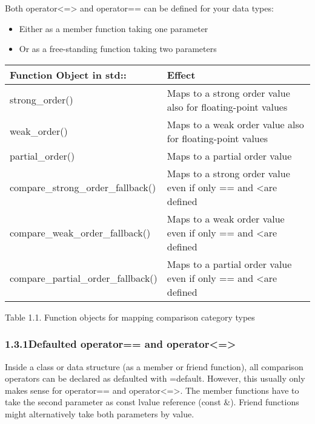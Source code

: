 

Both operator<=> and operator== can be defined for your data types:

\begin{itemize}
\item
Either as a member function taking one parameter

\item
Or as a free-standing function taking two parameters
\end{itemize}


\begin{table}[H]
\begin{tabular}{|l|l|}
	\hline
	\textbf{Function Object in std::} & \textbf{Effect}                                             \\ \hline
	strong\_order()                   & Maps to a strong order value also for floating-point values \\ \hline
	weak\_order()                     & Maps to a weak order value also for floating-point values   \\ \hline
	partial\_order()                  & Maps to a partial order value                               \\ \hline
	compare\_strong\_order\_fallback()  & Maps to a strong order value even if only == and \textless are defined  \\ \hline
	compare\_weak\_order\_fallback()    & Maps to a weak order value even if only == and \textless are defined    \\ \hline
	compare\_partial\_order\_fallback() & Maps to a partial order value even if only == and \textless are defined \\ \hline
\end{tabular}
\end{table}

\begin{center}
Table 1.1. Function objects for mapping comparison category types
\end{center}


\subsubsection*{ 1.3.1\hspace{0.2cm}Defaulted operator== and operator<=>}

Inside a class or data structure (as a member or friend function), all comparison operators can be declared as defaulted with =default. However, this usually only makes sense for operator== and operator<=>. The member functions have to take the second parameter as const lvalue reference (const \&). Friend functions might alternatively take both parameters by value.

